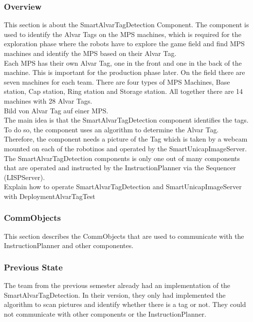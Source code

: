 \subsubsection{Overview}


This section is about the SmartAlvarTagDetection Component. The component is used to identify the Alvar Tags on the MPS machines, which is required for the exploration phase where the robots have to explore the game field and find MPS machines and identify the MPS based on their Alvar Tag. \\

Each MPS has their own Alvar Tag, one in the front and one in the back of the machine. This is important for the production phase later. On the field there are seven machines for each team. There are four types of MPS Machines, Base station, Cap station, Ring station and Storage station. All together there are 14 machines with 28 Alvar Tags. \\
Bild von Alvar Tag auf einer MPS. \\

The main idea is that the SmartAlvarTagDetection component identifies the tags. To do so, the component uses an algorithm to determine the Alvar Tag. Therefore, the component needs a picture of the Tag which is taken by a webcam mounted on each of the robotinos and operated by the SmartUnicapImageServer. The SmartAlvarTagDetection components is only one out of many components that are operated and instructed by the InstructionPlanner via the Sequencer (LISPServer). \\
Explain how to operate SmartAlvarTagDetection and SmartUnicapImageServer with DeploymentAlvarTagTest

\subsubsection{CommObjects}

This section describes the CommObjects that are used to communicate with the InstructionPlanner and other componentes.

\subsubsection{Previous State}

The team from the previous semester already had an implementation of the SmartAlvarTagDetection. In their version, they only had implemented the algorithm to scan pictures and identify whether there is a tag or not. They could not communicate with other components or the InstructionPlanner. \\

